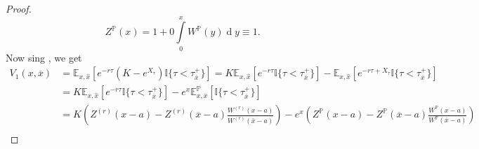 \documentclass[10pt]{amsart}
\def\E{{\mathbb{E}}}
\def\Eq{{\mathbb{E}
		_{x,\hat{x}}}}
\def\P{{\mathbb{P}}}
\def \R{{{\rm I{\!}\rm R}}}
\def \I{{\mathbb{I}}}
\newcommand{\dx}{\operatorname{d}\!}
\def\P{{\mathbb P}} \def\le{\left} \def\ri{\right} \def\i{\infty}
\def\E{{\mathbb E}} \def\PP{\mc P} \def\Z{{\mathbb Z}} \def\R{{\mathbb R}}
\begin{document}
\begin{proof}
			\begin{equation}\label{Z_P}
				Z^{\mathbb{P}}(x) = 1 + 0\int\limits_{0}^{x} W^{\mathbb{P}}(y)\dx y \equiv 1.
			\end{equation}
			Now sing \cite[eq. (2.4)]{MP}, we get
			\begin{align}
				\nonumber	V_1(x, \overline{x}) &= \Eq\left[ e^{-r\tau} \left( K - e^{X_\tau} \right) \I
				\{ \tau < \tau_{\overline{x}}^+ \} \right]  = K\Eq \left[ e^{-r\tau} \I
				\{ \tau < \tau_{\overline{x}}^+ \} \right] - \Eq\left[ e^{-r\tau + X_\tau} \I
				\{ \tau < \tau_{\overline{x}}^+ \} \right] \\
				\nonumber & =  K\Eq \left[ e^{-r\tau} \I
				\{ \tau < \tau_{\overline{x}}^+ \} \right] - e^x \E^\P_{x, \overline{x}}\left[ \I
				\{ \tau < \tau_{\overline{x}}^+ \} \right] \\
				\nonumber & =  K\left( Z^{(r)}(x-a) - Z^{(r)}(\overline{x}-a)\frac{W^{(r)}(x-a)}{W^{(r)}(\overline{x}-a)} \right) -e^x\left( Z^{\P}(x-a) - Z^{\P}(\overline{x}-a)\frac{W^{\P}(x-a)}{W^{\P}(\overline{x}-a)} \right) \\

\end{align}
\end{proof}
\end{document}

